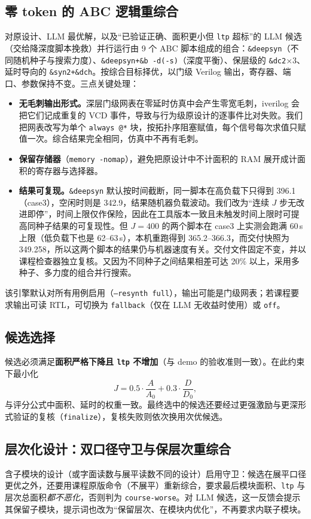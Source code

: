 \documentclass[UTF8,a4paper,zihao=5]{ctexart}
\newcommand{\code}[1]{\texttt{#1}}
\begin{document}
\subsection{零 token 的 ABC 逻辑重综合}
对原设计、LLM 最优解，以及“已验证正确、面积更小但 \code{ltp} 超标”的 LLM 候选（交给降深度脚本挽救）并行运行由 9 个 ABC 脚本组成的组合：\code{\&deepsyn}（不同随机种子与搜索力度）、\code{\&deepsyn+\&b -d(-s)}（深度平衡）、保层级的 \code{\&dc2}×3、延时导向的 \code{\&syn2+\&dch}。按综合目标择优，以门级 Verilog 输出，寄存器、端口、参数保持不变。三点关键处理：
\begin{itemize}
\item \textbf{无毛刺输出形式。}深层门级网表在零延时仿真中会产生零宽毛刺，iverilog 会把它们记成重复的 VCD 事件，导致与行为级原设计的逐事件比对失败。我们把网表改写为单个 \code{always @*} 块，按拓扑序阻塞赋值，每个信号每次求值只赋值一次。综合结果完全相同，仿真中不再有毛刺。
\item \textbf{保留存储器}（\code{memory -nomap}），避免把原设计中不计面积的 RAM 展开成计面积的寄存器与选择器。
\item \textbf{结果可复现。}\code{\&deepsyn} 默认按时间截断，同一脚本在高负载下只得到 396.1（case3），空闲时则是 342.9，结果随机器负载波动。我们改为“连续 $J$ 步无改进即停”，时间上限仅作保险，因此在工具版本一致且未触发时间上限时可提高同种子结果的可复现性。但 $J=400$ 的两个脚本在 case3 上实测会跑满 60\,s 上限（低负载下也是 62--63\,s），本机重跑得到 365.2--366.3，而交付快照为 349.258，所以这两个脚本的结果仍与机器速度有关。交付文件固定不变，并以课程检查器独立复核。又因为不同种子之间结果相差可达 20\% 以上，采用多种子、多力度的组合并行搜索。
\end{itemize}
该引擎默认对所有用例启用（\code{--resynth full}），输出可能是门级网表；若课程要求输出可读 RTL，可切换为 \code{fallback}（仅在 LLM 无收益时使用）或 \code{off}。

\subsection{候选选择}
候选必须满足\textbf{面积严格下降且 \code{ltp} 不增加}（与 demo 的验收准则一致）。在此约束下最小化
\[ J = 0.5\cdot \frac{A}{A_0} + 0.3\cdot\frac{D}{D_0}, \]
与评分公式中面积、延时的权重一致。最终选中的候选还要经过更强激励与更深形式验证的复核（\code{finalize}），复核失败则依次换用次优候选。

\subsection{层次化设计：双口径守卫与保层次重综合}\label{sec:hier}
含子模块的设计（或字面读数与展平读数不同的设计）启用守卫：候选在展平口径更优之外，还要用课程原版命令（不展平）重新综合，要求最后模块面积、\code{ltp} 与层次总面积\emph{都不恶化}，否则判为 \code{course-worse}。对 LLM 候选，这一反馈会提示其保留子模块，提示词也改为“保留层次、在模块内优化”，不再要求内联子模块。
\end{document}
